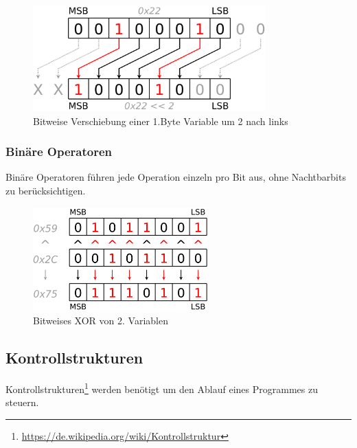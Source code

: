\begin{figure}[h]
\centering
\includegraphics[width=0.8\textwidth]{./media/images/compiler/language_specification_shift_operator.png}
\caption{Bitweise Verschiebung einer 1.Byte Variable um 2 nach links}
\label{language_specification_shift_operator}
\end{figure}


\subsubsection{Bin\"are Operatoren}

Bin\"are Operatoren f\"uhren jede Operation einzeln pro Bit aus, ohne Nachtbarbits zu ber\"ucksichtigen.

\begin{figure}[h]
\centering
\includegraphics[width=0.6\textwidth]{./media/images/compiler/language_specification_binary_operator_xor.png}
\caption{Bitweises XOR von 2. Variablen}
\label{language_specification_binary_operator_xor}
\end{figure}

\newpage
\subsection{Kontrollstrukturen}

Kontrollstrukturen\footnote{\url{https://de.wikipedia.org/wiki/Kontrollstruktur} } werden ben\"otigt um den Ablauf eines Programmes zu steuern.

